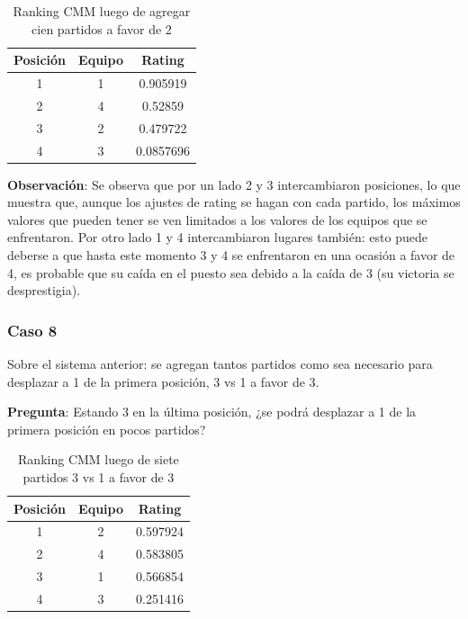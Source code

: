 \begin{table}[h!]
    \begin{center}
        \begin{tabular}{|c|c|c|}
        \hline
        \textbf{Posición} & \textbf{Equipo} & \textbf{Rating} \\
        \hline
        1 & 1 & 0.905919\\
        2 & 4 & 0.52859\\
        3 & 2 & 0.479722\\
        4 & 3 & 0.0857696\\
        \hline
        \end{tabular}
        \caption{Ranking CMM luego de agregar cien partidos a favor de 2}
        \label{cmm_caso_7}
    \end{center}
\end{table}

\textbf{Observación}: Se observa que por un lado 2 y 3 intercambiaron posiciones, lo que muestra que, aunque los ajustes de rating se hagan con cada partido, los máximos valores que pueden tener se ven limitados a los valores de los equipos que se enfrentaron. Por otro lado 1 y 4 intercambiaron lugares también: esto puede deberse a que hasta este momento 3 y 4 se enfrentaron en una ocasión a favor de 4, es probable que su caída en el puesto sea debido a la caída de 3 (su victoria se desprestigia).

\subsubsection*{Caso 8}

Sobre el sistema anterior: se agregan tantos partidos como sea necesario para desplazar a 1 de la primera posición, 3 vs 1 a favor de 3.

\textbf{Pregunta}: Estando 3 en la última posición, ¿se podrá desplazar a 1 de la primera posición en pocos partidos?

\begin{table}[h!]
    \begin{center}
        \begin{tabular}{|c|c|c|}
        \hline
        \textbf{Posición} & \textbf{Equipo} & \textbf{Rating} \\
        \hline
        1 & 2 & 0.597924\\
        2 & 4 & 0.583805\\
        3 & 1 & 0.566854\\
        4 & 3 & 0.251416\\
        \hline
        \end{tabular}
        \caption{Ranking CMM luego de siete partidos 3 vs 1 a favor de 3}
        \label{cmm_caso_8}
    \end{center}
\end{table}

